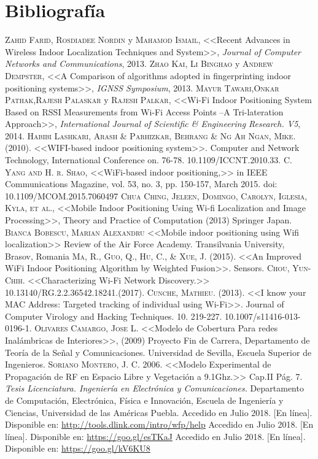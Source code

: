 \chapter{Bibliografía}

\begin{thebibliography}{X}
 \textsc{Zahid Farid, Rosdiadee Nordin} y \textsc{Mahamod Ismail}, <<Recent Advances in Wireless Indoor Localization Techniques and System>>, \textit{Journal of Computer Networks and Communications}, 2013.
 \textsc{Zhao Kai, Li Binghao} y \textsc{Andrew Dempster}, <<A Comparison of algorithms adopted in fingerprinting indoor positioning systems>>, \textit{IGNSS Symposium}, 2013.
 \textsc{Mayur Tawari},\textsc{Onkar Pathak},\textsc{Rajesh Palaskar} y \textsc{Rajesh Palkar}, <<Wi-Fi Indoor Positioning System Based on RSSI Measurements from Wi-Fi Access Points –A Tri-lateration Approach>>, \textit{International Journal of Scientific \& Engineering Research. V5}, 2014.
 \textsc{Habibi Lashkari, Arash \& Parhizkar, Behrang \& Ng Ah Ngan, Mike.} (2010). <<WIFI-based indoor positioning system>>. Computer and Network Technology, International Conference on. 76-78. 10.1109/ICCNT.2010.33. 
 \textsc{C. Yang and H. r. Shao}, <<WiFi-based indoor positioning,>> in IEEE Communications Magazine, vol. 53, no. 3, pp. 150-157, March 2015. doi: 10.1109/MCOM.2015.7060497
 \textsc{Chua Ching, Jeleen, Domingo, Carolyn, Iglesia, Kyla, et al.}, <<Mobile Indoor Positioning Using Wi-fi Localization and Image Processing>>, Theory and Practice of Computation (2013) Springer Japan.
 \textsc{Bianca Bobescu, Marian Alexandru} <<Mobile indoor positioning using Wifi localization>> Review of the Air Force Academy. Transilvania University, Brasov, Romania
 \textsc{Ma, R., Guo, Q., Hu, C., \& Xue, J.} (2015). <<An Improved WiFi Indoor Positioning Algorithm by Weighted Fusion>>. Sensors.
 \textsc{Chou, Yun-Chih.} <<Characterizing Wi-Fi Network Discovery.>> 10.13140/RG.2.2.36542.18241.(2017).
 \textsc{Cunche, Mathieu.} (2013). <<I know your MAC Address: Targeted tracking of individual using Wi-Fi>>. Journal of Computer Virology and Hacking Techniques. 10. 219-227. 10.1007/s11416-013-0196-1. 
\textsc{Olivares Camargo, Jose L.} <<Modelo de Cobertura Para redes Inalámbricas de Interiores>>, (2009) Proyecto Fin de Carrera, Departamento de Teoría de la Señal y Comunicaciones. Universidad de Sevilla, Escuela Superior de Ingenieros.\label{pdf:1}
 \textsc{Soriano Montero, J. C.} 2006. <<Modelo Experimental de Propagación de RF en Espacio Libre y Vegetación a 9.1Ghz.>> Cap.II Pág. 7. \textit{Tesis Licenciatura. Ingeniería en Electrónica y Comunicaciones.} Departamento de Computación, Electrónica, Física e Innovación, Escuela de Ingeniería y Ciencias, Universidad de las Américas Puebla. \label{pdf:modprop}
 Accedido en Julio 2018. [En línea]. Disponible en: \url{http://tools.dlink.com/intro/wfp/help} \label{fig:prop}
 Accedido en Julio 2018. [En línea]. Disponible en: \url{https://goo.gl/esTKaJ} \label{fig:paginaHP}
 Accedido en Julio 2018. [En línea]. Disponible en: \url{https://goo.gl/kV6KU8}
\end{thebibliography}

